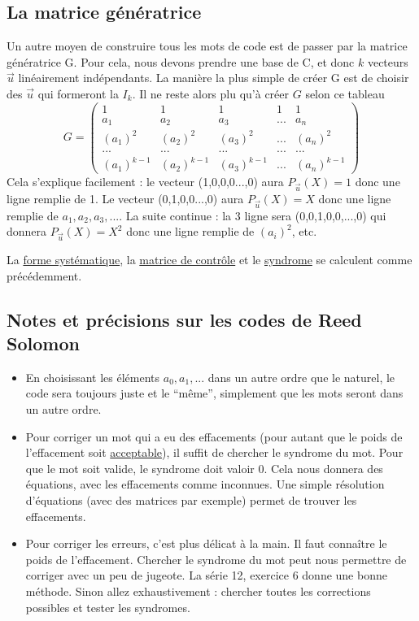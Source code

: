 \documentclass[11pt,a4paper]{article}
\begin{document}
\subsection{La matrice génératrice}
Un autre moyen de construire tous les mots de code est de passer par la matrice génératrice G. Pour cela, nous devons prendre une base de C, et donc $k$ vecteurs $\vec{u}$ linéairement indépendants. La manière la plus simple de créer G est de choisir des $\vec{u}$ qui formeront la $I_k$. Il ne reste alors plu qu'à créer $G$ selon ce tableau
	\[G = \begin{pmatrix}
	1 & 1 & 1 & 1 & 1\\
	a_1 & a_2 & a_3 & ... & a_n\\
	(a_1)^2 & (a_2)^2 & (a_3)^2 & ... & (a_n)^2\\
	... & ... & ... & ... & ...\\
	(a_1)^{k-1} & (a_2)^{k-1} & (a_3)^{k-1} & ... & (a_n)^{k-1}
	\end{pmatrix}\]
Cela s'explique facilement : le vecteur (1,0,0,0...,0) aura $P_{\vec{u}}(X) = 1$ donc une ligne remplie de 1. Le vecteur (0,1,0,0...,0) aura $P_{\vec{u}}(X) = X$ donc une ligne remplie de $a_1,a_2,a_3,...$. La suite continue : la 3 ligne sera (0,0,1,0,0,...,0) qui donnera $P_{\vec{u}}(X) = X^2$ donc une ligne remplie de $(a_i)^2$, etc. 	

La \hyperref[systematique]{forme systématique}, la \hyperref[controle]{matrice de contrôle} et le \hyperref[syndrome]{syndrome} se calculent comme précédemment.

\subsection[Notes/précisions sur Reed Solomon]{Notes et précisions sur les codes de Reed Solomon}
\begin{itemize}
	\item 	En choisissant les éléments $a_0,a_1,...$ dans un autre ordre que le naturel, le code sera toujours juste et le \enquote{même}, simplement que les mots seront dans un autre ordre.
	\item 	Pour corriger un mot qui a eu des effacements (pour autant que le poids de l'effacement soit \hyperref[canaux]{acceptable}), il suffit de chercher le syndrome du mot. Pour que le mot soit valide, le syndrome doit valoir 0. Cela nous donnera des équations, avec les effacements comme inconnues. Une simple résolution d'équations (avec des matrices par exemple) permet de trouver les effacements.
	\item 	Pour corriger les erreurs, c'est plus délicat à la main. Il faut connaître le poids de l'effacement. Chercher le syndrome du mot peut nous permettre de corriger avec un peu de jugeote. La série 12, exercice 6 donne une bonne méthode. Sinon allez exhaustivement : chercher toutes les corrections possibles et tester les syndromes.
\end{itemize}
\end{document}
